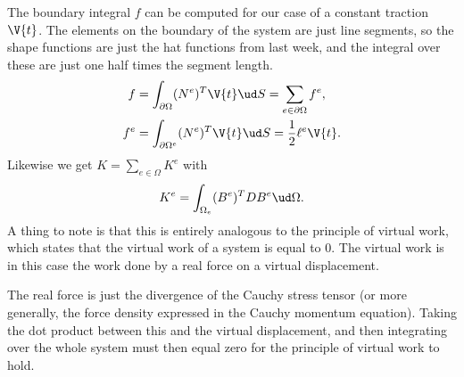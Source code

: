 \documentclass[sigconf]{acmart}
\begin{document}
The boundary integral $ f $ can be computed for our case of a constant traction $ \V{t} $. The elements on the boundary of the system are just line segments, so the shape functions are just the hat functions from last week, and the integral over these are just one half times the segment length.
\begin{align*}
	f &= \int_{\partial\Omega} (N^e)^T \V{t} \ud S = \sum_{e \in \partial \Omega} f^e, \\
	f^e &= \int_{\partial \Omega^e} (N^e)^T \V{t} \ud S = \frac{1}{2} \ell^e \V{t}.
\end{align*}
Likewise we get $ K = \sum_{e\in \Omega}K^e $ with 
\begin{equation*}
	K^e = \int_{\Omega_e}(B^e)^T D B^e \ud \Omega.
\end{equation*}
A thing to note is that this is entirely analogous to the principle of virtual work, which states that the virtual work of a system is equal to 0. The virtual work is in this case the work done by a real force on a virtual displacement.

The real force is just the divergence of the Cauchy stress tensor (or more generally, the force density expressed in the Cauchy momentum equation). Taking the dot product between this and the virtual displacement, and then integrating over the whole system must then equal zero for the principle of virtual work to hold.
\end{document}
